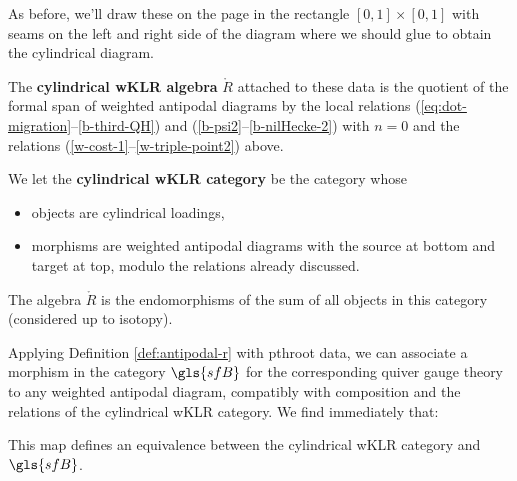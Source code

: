 As before, we'll draw these on the page in the rectangle $[0,1]\times
[0,1]$ with seams on the left and right side of the diagram where we
should glue to obtain the cylindrical diagram.  

\begin{definition}  The {\bf cylindrical wKLR algebra} $\mathring{R}$ attached to
  these data is the quotient of the formal span of weighted antipodal
  diagrams by the local relations
  (\ref{eq:dot-migration}--\ref{b-third-QH})
 and  (\ref{b-psi2}--\ref{b-nilHecke-2}) with $n=0$  and the relations
 (\ref{w-cost-1}--\ref{w-triple-point2}) above.

 We let the {\bf cylindrical wKLR category} be the category whose
  \begin{itemize}
  \item objects are cylindrical loadings,
  \item   morphisms are weighted antipodal diagrams with the source at
    bottom and target at top, modulo the relations already discussed.
  \end{itemize}
The algebra $\mathring{R}$ is the endomorphisms of the sum of all objects in this category (considered up to isotopy).
\end{definition}
Applying Definition \ref{def:antipodal-r} with \gls{pthroot} data, we
can associate a morphism in the category $\gls{sfB}$ for the
corresponding quiver gauge theory to any weighted antipodal
diagram, compatibly with composition and the relations of the cylindrical wKLR category.
We find immediately that:
\begin{theorem}\label{thm:KLR-B}
 This map defines an equivalence between the cylindrical wKLR category
 and $\gls{sfB}$.
\end{theorem}

